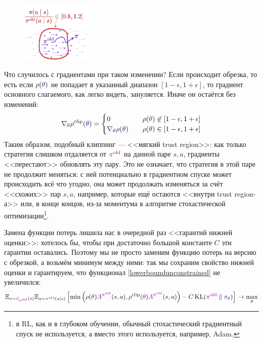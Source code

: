 \begin{figure}
\vspace{-0.5cm}
\centering
\includegraphics[width=0.3\textwidth]{Images/TrustRegion2.png}
\vspace{-0.5cm}
\end{figure}
Что случилось с градиентами при таком изменении? Если происходит обрезка, то есть если $\rho(\textcolor{ChadBlue}{\theta})$ не попадает в указанный диапазон $[1 - \epsilon, 1 + \epsilon]$, то градиент основного слагаемого, как легко видеть, зануляется. Иначе он остаётся без изменений:
$$\textcolor{ChadBlue}{\nabla_\theta} \rho^{\clip}(\textcolor{ChadBlue}{\theta}) = 
\begin{cases}
0 \quad &\rho(\textcolor{ChadBlue}{\theta}) \not\in [1 - \epsilon, 1 + \epsilon] \\
\textcolor{ChadBlue}{\nabla_\theta} \rho(\textcolor{ChadBlue}{\theta}) \quad &\rho(\textcolor{ChadBlue}{\theta}) \in [1 - \epsilon, 1 + \epsilon] \\
\end{cases}
$$
Таким образом, подобный клиппинг --- <<мягкий trust region>>: как только стратегия слишком отдаляется от $\textcolor{ChadPurple}{\pi^{\old}}$ на данной паре $s, a$, градиенты <<перестают>> обновлять эту пару. Это не означает, что стратегия в этой паре не продолжит меняться: с ней потенциально в градиентном спуске может происходить всё что угодно, она может продолжать изменяться за счёт <<схожих>> пар $s, a$, например, которые ещё остаются <<внутри trust region-а>> или, в конце концов, из-за моментума в алгоритме стохастической оптимизации\footnote{в RL, как и в глубоком обучении, обычный стохастический градиентный спуск не используется, а вместо этого используется, например, Adam.}.

Замена функции потерь лишила нас в очередной раз <<гарантий нижней оценки>>: хотелось бы, чтобы при достаточно большой константе $C$ эти гарантии оставались. Поэтому мы не просто заменим функцию потерь на версию с обрезкой, а возьмём минимум между ними: так мы сохраним свойство нижней оценки и гарантируем, что функционал \eqref{lowerboundunconstrained} не увеличился: 
\begin{equation}\label{PPOlowerbound}
\E_{s \sim \textcolor{ChadPurple}{d_{\pi^{\old}}}(s)} \E_{a \sim \textcolor{ChadPurple}{\pi^{\old}}(a \mid s)}  \left[ \min \left( \rho(\textcolor{ChadBlue}{\theta}) \textcolor{ChadPurple}{A^{\pi^{\old}}}(s, a), \rho^{\clip}(\textcolor{ChadBlue}{\theta}) \textcolor{ChadPurple}{A^{\pi^{\old}}}(s, a)\right) - C \KL(\textcolor{ChadPurple}{\pi^{\old}} \parallel \textcolor{ChadBlue}{\pi_\theta}) \right] \to \max_\theta
\end{equation}

